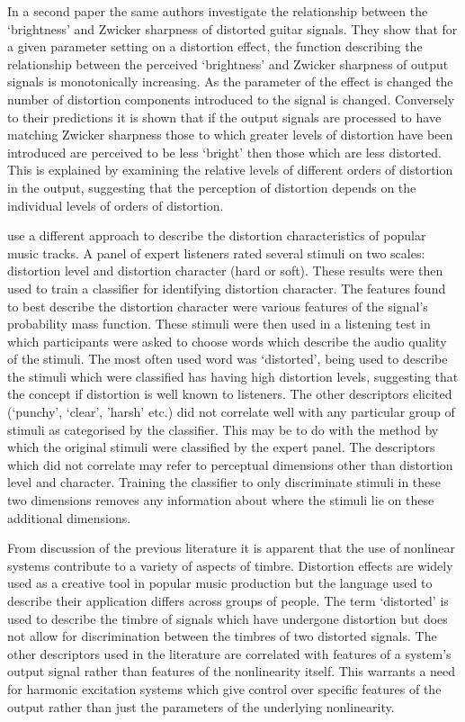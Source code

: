 	In a second paper \citep{tsumoto2016the} the same authors investigate the relationship between the `brightness' and
	Zwicker sharpness of distorted guitar signals. They show that for a given parameter setting on a distortion effect,
	the function describing the relationship between the perceived `brightness' and Zwicker sharpness of output signals
	is monotonically increasing. As the parameter of the effect is changed the number of distortion components
	introduced to the signal is changed. Conversely to their predictions it is shown that if the output signals are
	processed to have matching Zwicker sharpness those to which greater levels of distortion have been introduced are
	perceived to be less `bright' then those which are less distorted. This is explained by examining the relative
	levels of different orders of distortion in the output, suggesting that the perception of distortion depends on the
	individual levels of orders of distortion.

	\citet{wilson2014characterisation} use a different approach to describe the distortion characteristics of popular
	music tracks. A panel of expert listeners rated several stimuli on two scales: distortion level and distortion
	character (hard or soft). These results were then used to train a classifier for identifying distortion character.
	The features found to best describe the distortion character were various features of the signal's probability mass
	function. These stimuli were then used in a listening test in which participants were asked to choose words which
	describe the audio quality of the stimuli. The most often used word was `distorted', being used to describe the
	stimuli which were classified has having high distortion levels, suggesting that the concept if distortion is well
	known to listeners. The other descriptors elicited (`punchy', `clear', 'harsh' etc.) did not correlate well with
	any particular group of stimuli as categorised by the classifier. This may be to do with the method by which the
	original stimuli were classified by the expert panel. The descriptors which did not correlate may refer to
	perceptual dimensions other than distortion level and character. Training the classifier to only discriminate
	stimuli in these two dimensions removes any information about where the stimuli lie on these additional dimensions.

	From discussion of the previous literature it is apparent that the use of nonlinear systems contribute to a variety
	of aspects of timbre. Distortion effects are widely used as a creative tool in popular music production but the
	language used to describe their application differs across groups of people. The term `distorted' is used to
	describe the timbre of signals which have undergone distortion but does not allow for discrimination between the
	timbres of two distorted signals. The other descriptors used in the literature are correlated with features of a
	system's output signal rather than features of the nonlinearity itself. This warrants a need for harmonic
	excitation systems which give control over specific features of the output rather than just the parameters of the
	underlying nonlinearity. 

